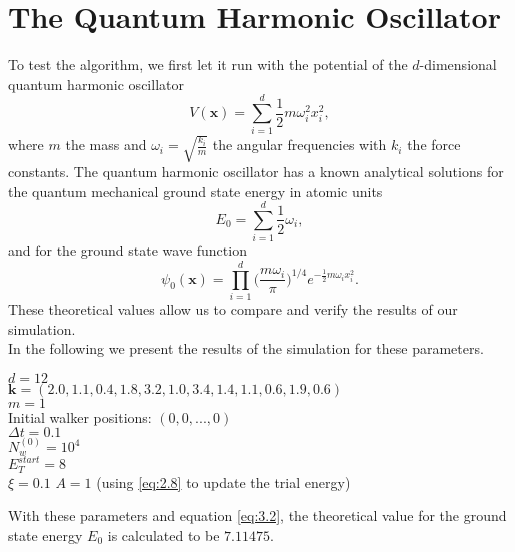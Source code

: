 \documentclass [12pt]{report}
\begin{document}
\section{The Quantum Harmonic Oscillator}
To test the algorithm, we first let it run with the potential of the $d$-dimensional quantum harmonic oscillator
\begin{equation}\label{eq:3.1} 
V(\bm{x}) = \sum_{i=1}^d \frac{1}{2} m \omega_i^2 x_i^2,
\end{equation}
where $m$ the mass and $\omega_i = \sqrt{\frac{k_i}{m}}$ the angular frequencies with $k_i$ the force constants. The quantum harmonic oscillator has a known analytical solutions for the quantum mechanical ground state energy in atomic units
\begin{equation}\label{eq:3.2} 
E_0 = \sum_{i=1}^d \frac{1}{2}\omega_i,
\end{equation}
and for the ground state wave function
\begin{equation}\label{eq:3.3} 
\psi_0(\bm{x}) = \prod_{i=1}^d \biggl(\frac{m \omega_i}{\pi}\biggr)^{1/4} e^{-\frac{1}{2} m \omega_i x_i^2}.
\end{equation}
These theoretical values allow us to compare and verify the results of our simulation.\\
In the following we present the results of the simulation for these parameters.

\begin{addmargin}[1cm]{1cm}
$d = 12$ \\
$\bm{k} = (2.0,  1.1,  0.4,  1.8,  3.2,  1.0,  3.4,  1.4,  1.1,  0.6,  1.9,  0.6 )$\\
$m =1$ \\
Initial walker positions: $(0,0,...,0)$\\
$\Delta t = 0.1$ \\
$N_w^{(0)} = 10^4$ \\
$E_T^{start} = 8$\\
$\xi = 0.1$
$A = 1$ (using \eqref{eq:2.8} to update the trial energy)\\
\end{addmargin}
With these parameters and equation \eqref{eq:3.2}, the theoretical value for the ground state energy $E_0$ is calculated to be $7.11475$.
\end{document}
